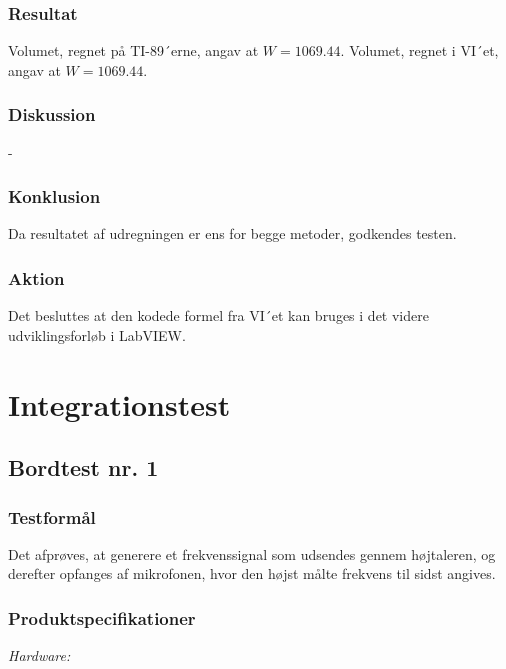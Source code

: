         \subsubsection{Resultat}
        
        Volumet, regnet på TI-89´erne, angav at $W=1069.44$.
        Volumet, regnet i VI´et, angav at $W=1069.44$.

		\subsubsection{Diskussion} 
	-
	
	
		\subsubsection{Konklusion}
		 
	Da resultatet af udregningen er ens for begge metoder, godkendes testen. 
	
	   \subsubsection{Aktion}
Det besluttes at den kodede formel fra VI´et kan bruges i det videre udviklingsforløb i LabVIEW. 



\section{Integrationstest}

	\subsection{Bordtest nr. 1} %
	\label{bordtest1}
		\subsubsection{Testformål}
		Det afprøves, at generere et frekvenssignal som udsendes gennem højtaleren, og derefter opfanges af mikrofonen, hvor den højst målte frekvens til sidst angives.  
		\subsubsection{Produktspecifikationer}
		
		\textit{Hardware:}\\
		\\
		\hojtalerkabel\\
		\pins\\
		\arduino\\
		\PC\\
		\usbkabel\\
	
